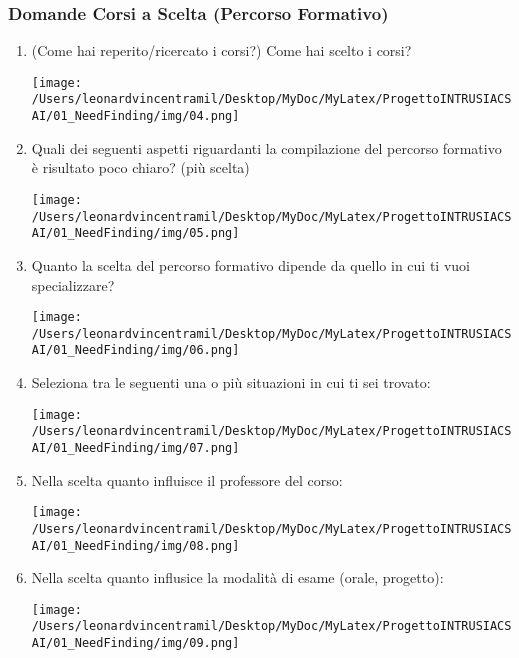 \subsubsection{Domande Corsi a Scelta (Percorso Formativo)}
\begin{enumerate}
    \item (Come hai reperito/ricercato i corsi?) Come hai scelto i corsi?
    \begin{center}
        \texttt{[image: /Users/leonardvincentramil/Desktop/MyDoc/MyLatex/ProgettoINTRUSIACSAI/01\_NeedFinding/img/04.png]}
    \end{center} 
    \item Quali dei seguenti aspetti riguardanti la compilazione del percorso formativo è risultato poco chiaro? (più scelta)
    \begin{center}
        \texttt{[image: /Users/leonardvincentramil/Desktop/MyDoc/MyLatex/ProgettoINTRUSIACSAI/01\_NeedFinding/img/05.png]}
    \end{center}
    \item Quanto la scelta del percorso formativo dipende da quello in cui ti vuoi specializzare?
    \begin{center}
        \texttt{[image: /Users/leonardvincentramil/Desktop/MyDoc/MyLatex/ProgettoINTRUSIACSAI/01\_NeedFinding/img/06.png]}
    \end{center} 
    \item Seleziona tra le seguenti una o più situazioni in cui ti sei trovato:
    \begin{center}
        \texttt{[image: /Users/leonardvincentramil/Desktop/MyDoc/MyLatex/ProgettoINTRUSIACSAI/01\_NeedFinding/img/07.png]}
    \end{center}
    \item Nella scelta quanto influisce il professore del corso:
    \begin{center}
        \texttt{[image: /Users/leonardvincentramil/Desktop/MyDoc/MyLatex/ProgettoINTRUSIACSAI/01\_NeedFinding/img/08.png]}
    \end{center} 
    \item Nella scelta quanto influsice la modalità di esame (orale, progetto):
    \begin{center}
        \texttt{[image: /Users/leonardvincentramil/Desktop/MyDoc/MyLatex/ProgettoINTRUSIACSAI/01\_NeedFinding/img/09.png]}
    \end{center} 
\end{enumerate}

